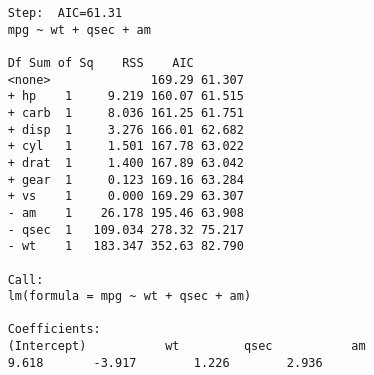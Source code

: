 \documentclass[a4paper,12pt]{article}
\begin{document}
\begin{framed}
	\begin{verbatim}
	Step:  AIC=61.31
	mpg ~ wt + qsec + am
	
	Df Sum of Sq    RSS    AIC
	<none>              169.29 61.307
	+ hp    1     9.219 160.07 61.515
	+ carb  1     8.036 161.25 61.751
	+ disp  1     3.276 166.01 62.682
	+ cyl   1     1.501 167.78 63.022
	+ drat  1     1.400 167.89 63.042
	+ gear  1     0.123 169.16 63.284
	+ vs    1     0.000 169.29 63.307
	- am    1    26.178 195.46 63.908
	- qsec  1   109.034 278.32 75.217
	- wt    1   183.347 352.63 82.790
	
	Call:
	lm(formula = mpg ~ wt + qsec + am)
	
	Coefficients:
	(Intercept)           wt         qsec           am
	9.618       -3.917        1.226        2.936
	\end{verbatim}
\end{framed}
\end{document}
